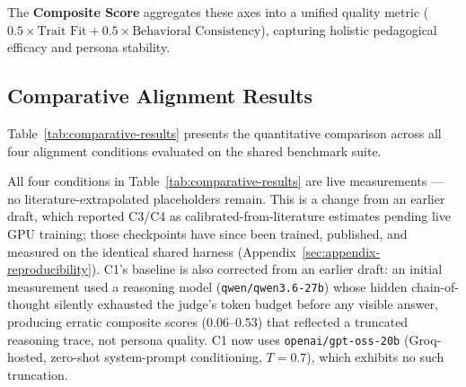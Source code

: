 The \textbf{Composite Score} aggregates these axes into a unified quality metric ($0.5 \times \text{Trait Fit} + 0.5 \times \text{Behavioral Consistency}$), capturing holistic pedagogical efficacy and persona stability.

\subsection{Comparative Alignment Results}
\label{subsec:comparative-results}

Table~\ref{tab:comparative-results} presents the quantitative comparison across all four alignment conditions evaluated on the shared benchmark suite.



All four conditions in Table~\ref{tab:comparative-results} are live measurements — no literature-extrapolated placeholders remain. This is a change from an earlier draft, which reported C3/C4 as calibrated-from-literature estimates pending live GPU training; those checkpoints have since been trained, published, and measured on the identical shared harness (Appendix~\ref{sec:appendix-reproducibility}). C1's baseline is also corrected from an earlier draft: an initial measurement used a reasoning model (\texttt{qwen/qwen3.6-27b}) whose hidden chain-of-thought silently exhausted the judge's token budget before any visible answer, producing erratic composite scores ($0.06$--$0.53$) that reflected a truncated reasoning trace, not persona quality. C1 now uses \texttt{openai/gpt-oss-20b} (Groq-hosted, zero-shot system-prompt conditioning, $T=0.7$), which exhibits no such truncation.

